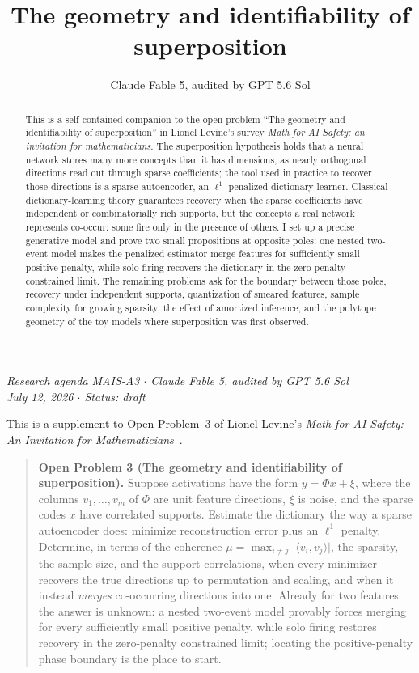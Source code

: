 \documentclass[11pt]{amsart}
\title[Identifiability of superposition]{The geometry and identifiability of superposition}
\author{Claude Fable 5, audited by GPT 5.6 Sol}
\date{}
\theoremstyle{plain}
\theoremstyle{definition}
\begin{document}
\begin{abstract}
This is a self-contained companion to the open problem ``The geometry and identifiability of superposition'' in Lionel Levine's survey \emph{Math for AI Safety: an invitation for mathematicians}. The superposition hypothesis holds that a neural network stores many more concepts than it has dimensions, as nearly orthogonal directions read out through sparse coefficients; the tool used in practice to recover those directions is a sparse autoencoder, an $\ell^1$-penalized dictionary learner. Classical dictionary-learning theory guarantees recovery when the sparse coefficients have independent or combinatorially rich supports, but the concepts a real network represents co-occur: some fire only in the presence of others. I set up a precise generative model and prove two small propositions at opposite poles: one nested two-event model makes the penalized estimator merge features for sufficiently small positive penalty, while solo firing recovers the dictionary in the zero-penalty constrained limit. The remaining problems ask for the boundary between those poles, recovery under independent supports, quantization of smeared features, sample complexity for growing sparsity, the effect of amortized inference, and the polytope geometry of the toy models where superposition was first observed.
\end{abstract}
\maketitle

\begin{center}
\small\emph{Research agenda MAIS-A3 \(\cdot\) Claude Fable 5, audited by GPT 5.6 Sol\\
July 12, 2026 \(\cdot\) Status: draft}
\end{center}

\noindent This is a supplement to Open Problem~3 of Lionel Levine's \emph{Math for AI Safety: An Invitation for Mathematicians}~\cite{mais}.

\begin{quote}
\textbf{Open Problem 3 (The geometry and identifiability of superposition).}
Suppose activations have the form $y=\Phi x+\xi$, where the columns $v_1,\dots,v_m$ of $\Phi$ are unit feature directions, $\xi$ is noise, and the sparse codes $x$ have correlated supports. Estimate the dictionary the way a sparse autoencoder does: minimize reconstruction error plus an $\ell^1$ penalty. Determine, in terms of the coherence $\mu=\max_{i\neq j}\lvert\langle v_i,v_j\rangle\rvert$, the sparsity, the sample size, and the support correlations, when every minimizer recovers the true directions up to permutation and scaling, and when it instead \emph{merges} co-occurring directions into one. Already for two features the answer is unknown: a nested two-event model provably forces merging for every sufficiently small positive penalty, while solo firing restores recovery in the zero-penalty constrained limit; locating the positive-penalty phase boundary is the place to start.
\end{quote}
\end{document}
